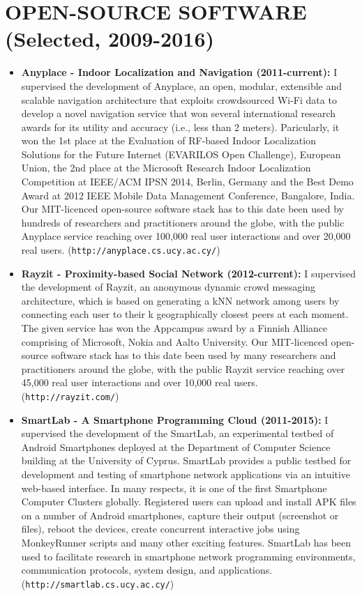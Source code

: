 \documentclass[10pt]{article}
\begin{document}
\section{\bf OPEN-SOURCE SOFTWARE (Selected, 2009-2016)}
\noindent
\begin{itemize}

\item
{\bf Anyplace - Indoor Localization and Navigation (2011-current):}
I supervised the development of Anyplace, an open, modular, extensible and scalable navigation architecture that exploits crowdsourced Wi-Fi data to develop a novel navigation service that won several international research awards for its utility and accuracy (i.e., less than 2 meters). Paricularly, it won the 1st place at the Evaluation of RF-based Indoor Localization Solutions for the Future Internet (EVARILOS Open Challenge), European Union, the 2nd place at the Microsoft Research Indoor Localization Competition at IEEE/ACM IPSN 2014, Berlin, Germany and the Best Demo Award at 2012 IEEE Mobile Data Management Conference, Bangalore, India. Our MIT-licenced open-source software stack has to this date been used by hundreds of researchers and practitioners around the globe, with the public Anyplace service reaching over 100,000 real user interactions and over 20,000 real users. ({\tt http://anyplace.cs.ucy.ac.cy/})

\item
{\bf Rayzit - Proximity-based Social Network (2012-current):}
I supervised the development of Rayzit, an anonymous dynamic crowd messaging architecture, which is based on
generating a kNN network among users by connecting each user to their k geographically closest peers at each moment.
The given service has won the Appcampus award by a Finnish Alliance comprising of Microsoft, Nokia and Aalto University.
Our MIT-licenced open-source software stack has to this date been used by many researchers and practitioners around the globe, with the public Rayzit service reaching over 45,000 real user interactions and over 10,000 real users. ({\tt http://rayzit.com/})

\item
{\bf SmartLab - A Smartphone Programming Cloud (2011-2015):}
I supervised the development of the SmartLab, an experimental testbed of Android Smartphones deployed at the Department of Computer Science building at the University of Cyprus. SmartLab provides a public testbed for development and testing of smartphone network applications via an intuitive web-based interface. In many respects, it is one of the first Smartphone Computer Clusters globally. Registered users can upload and install APK files on a number of Android smartphones, capture their output (screenshot or files), reboot the devices, create concurrent interactive jobs using MonkeyRunner scripts and many other exciting features. SmartLab has been used to facilitate research in smartphone network programming environments, communication protocols, system design, and applications. ({\tt http://smartlab.cs.ucy.ac.cy/})


\end{itemize}
\end{document}
